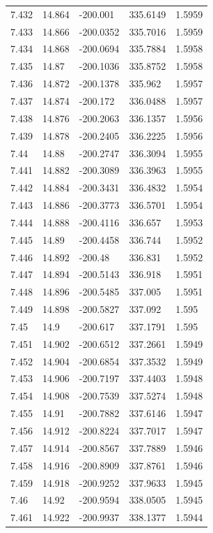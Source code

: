 \begin{tabular}{lllll}
7.432 & 14.864 & -200.001 & 335.6149 & 1.5959 \\
7.433 & 14.866 & -200.0352 & 335.7016 & 1.5959 \\
7.434 & 14.868 & -200.0694 & 335.7884 & 1.5958 \\
7.435 & 14.87 & -200.1036 & 335.8752 & 1.5958 \\
7.436 & 14.872 & -200.1378 & 335.962 & 1.5957 \\
7.437 & 14.874 & -200.172 & 336.0488 & 1.5957 \\
7.438 & 14.876 & -200.2063 & 336.1357 & 1.5956 \\
7.439 & 14.878 & -200.2405 & 336.2225 & 1.5956 \\
7.44 & 14.88 & -200.2747 & 336.3094 & 1.5955 \\
7.441 & 14.882 & -200.3089 & 336.3963 & 1.5955 \\
7.442 & 14.884 & -200.3431 & 336.4832 & 1.5954 \\
7.443 & 14.886 & -200.3773 & 336.5701 & 1.5954 \\
7.444 & 14.888 & -200.4116 & 336.657 & 1.5953 \\
7.445 & 14.89 & -200.4458 & 336.744 & 1.5952 \\
7.446 & 14.892 & -200.48 & 336.831 & 1.5952 \\
7.447 & 14.894 & -200.5143 & 336.918 & 1.5951 \\
7.448 & 14.896 & -200.5485 & 337.005 & 1.5951 \\
7.449 & 14.898 & -200.5827 & 337.092 & 1.595 \\
7.45 & 14.9 & -200.617 & 337.1791 & 1.595 \\
7.451 & 14.902 & -200.6512 & 337.2661 & 1.5949 \\
7.452 & 14.904 & -200.6854 & 337.3532 & 1.5949 \\
7.453 & 14.906 & -200.7197 & 337.4403 & 1.5948 \\
7.454 & 14.908 & -200.7539 & 337.5274 & 1.5948 \\
7.455 & 14.91 & -200.7882 & 337.6146 & 1.5947 \\
7.456 & 14.912 & -200.8224 & 337.7017 & 1.5947 \\
7.457 & 14.914 & -200.8567 & 337.7889 & 1.5946 \\
7.458 & 14.916 & -200.8909 & 337.8761 & 1.5946 \\
7.459 & 14.918 & -200.9252 & 337.9633 & 1.5945 \\
7.46 & 14.92 & -200.9594 & 338.0505 & 1.5945 \\
7.461 & 14.922 & -200.9937 & 338.1377 & 1.5944 \\

\end{tabular}
